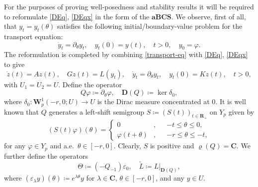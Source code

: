 \documentclass[a4paper,11pt,reqno]{amsart}
\def\la{\lambda}
\def\R{\mathbf{R}}
\def\C{\mathbf{C}}
\theoremstyle{plain}
\numberwithin{equation}{section}
\begin{document}
For the purposes of proving well-posedness and stability results it will be required to reformulate \eqref{DEq}, \eqref{DEqx} in the form of the $\mathbf{aBCS}$. We observe, first of all, that $y_t=y_t\left(\theta\right)$ satisfies the following initial/boundary-value problem for the transport equation:
\begin{equation}\label{transport-eq}
\dot{y}_t= \partial_\theta y_t,\quad y_t(0)= y(t), \quad t> 0,\quad y_0=\varphi.
\end{equation}
The reformulation is completed by combining \eqref{transport-eq} with \eqref{DEq}, \eqref{DEqx} to give
\begin{equation*}
\dot{z}(t)=A z(t),\quad Gz(t)= L(y_t), \quad \dot{y}_t= \partial_\theta y_t, \quad y_t(0)=Kz(t),\quad t>0,
\end{equation*}
with $U_1=U_2=U$. Define the operator
\begin{equation*}
Q\varphi\coloneqq \partial_\theta \varphi, \quad \bm{D}(Q)\coloneqq \ker\delta_0,
\end{equation*}
where $\delta_0:\bm{W}^{1}_p(-r,0;U)\to U$ is the Dirac measure concentrated at $0$. It is well known that $Q$ generates a left-shift semigroup $S\coloneqq (S(t))_{t\in\R_+}$ on $Y_p$ given by 
\begin{equation*}
(S(t)\varphi)(\theta)=\left\{\begin{split}
0&,&& -t\le \theta\le 0,\\
 \varphi(t+\theta)&,&& -r\le \theta\le -t,\end{split}\right.
\end{equation*}
for any $\varphi\in Y_p$ and a.e.\ $\theta\in [-r,0]$. Clearly, $S$ is positive and $\varrho(Q)=\C$. We further define the operators
\begin{equation*}
\Theta\coloneqq (-Q_{-1})\varepsilon_0, \quad \tilde{L}\coloneqq L\vert_{\bm{D}(Q)},
\end{equation*} 
where $(\varepsilon_\la y)(\theta)\coloneqq e^{\la \theta}y$ for $\la \in \C$, $\theta\in [-r,0]$, and any $y\in U$.
\end{document}
